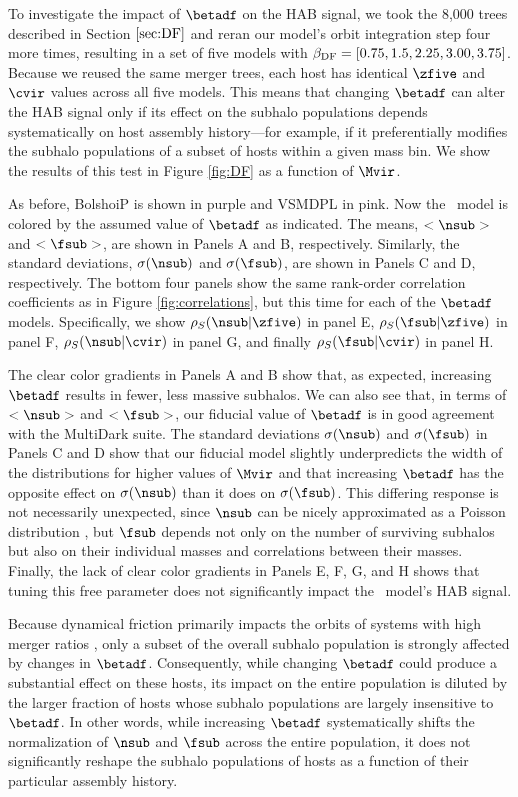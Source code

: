 To investigate the impact of $\betadf$ on the HAB signal, we took the 8,000 trees described in Section $\ref{sec:DF}$ and reran our model's orbit integration step four more times, resulting in a set of five models with $\beta_{\rm DF} = [0.75, 1.5, 2.25, 3.00, 3.75]$. Because we reused the same merger trees, each host has identical $\zfive$ and $\cvir$ values across all five models. This means that changing $\betadf$ can alter the HAB signal only if its effect on the subhalo populations depends systematically on host assembly history—for example, if it preferentially modifies the subhalo populations of a subset of hosts within a given mass bin. We show the results of this test in Figure \ref{fig:DF} as a function of $\Mvir$.

As before, BolshoiP is shown in purple and VSMDPL in pink. Now the \SatGen\ model is colored by the assumed value of $\betadf$ as indicated. The means, $<\nsub>$ and $<\fsub>$, are shown in Panels A and B, respectively. Similarly, the standard deviations, $\sigma(\nsub)$ and $\sigma(\fsub)$, are shown in Panels C and D, respectively. The bottom four panels show the same rank-order correlation coefficients as in Figure \ref{fig:correlations}, but this time for each of the $\betadf$ models. Specifically, we show $\rho_S(\nsub | \zfive)$ in panel E, $\rho_S(\fsub | \zfive)$ in panel F, $\rho_S(\nsub | \cvir)$ in panel G, and finally $\rho_S(\fsub | \cvir)$ in panel H. 

The clear color gradients in Panels A and B show that, as expected, increasing $\betadf$ results in fewer, less massive subhalos. We can also see that, in terms of $<\nsub>$ and $<\fsub>$, our fiducial value of $\betadf$ is in good agreement with the MultiDark suite. The standard deviations $\sigma(\nsub)$ and $\sigma(\fsub)$ in Panels C and D show that our fiducial model slightly underpredicts the width of the distributions for higher values of $\Mvir$ and that increasing $\betadf$ has the opposite effect on $\sigma(\nsub)$ than it does on $\sigma(\fsub)$. This differing response is not necessarily unexpected, since $\nsub$ can be nicely approximated as a Poisson distribution \citep{Jiang.vdBosch.17}, but $\fsub$ depends not only on the number of surviving subhalos but also on their individual masses and correlations between their masses. Finally, the lack of clear color gradients in Panels E, F, G, and H shows that tuning this free parameter does not significantly impact the \SatGen\ model's HAB signal.

Because dynamical friction primarily impacts the orbits of systems with high merger ratios \citep{vdBosch.99}, only a subset of the overall subhalo population is strongly affected by changes in $\betadf$. Consequently, while changing $\betadf$ could produce a substantial effect on these hosts, its impact on the entire population is diluted by the larger fraction of hosts whose subhalo populations are largely insensitive to $\betadf$. In other words, while increasing $\betadf$ systematically shifts the normalization of $\nsub$ and $\fsub$ across the entire population, it does not significantly reshape the subhalo populations of hosts as a function of their particular assembly history.

